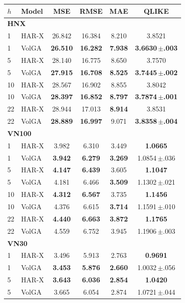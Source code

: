 \begin{tabular}{llcccc}
\toprule
$h$ & Model & MSE & RMSE & MAE & QLIKE \\
\midrule
\multicolumn{6}{l}{\textbf{HNX}} \\
1 & HAR-X & 26.842 & 16.384 & 8.210 & 3.8521 \\
1 & VolGA & \textbf{26.510} & \textbf{16.282} & \textbf{7.938} & \textbf{3.6630\,$\pm$.003} \\
5 & HAR-X & 28.140 & 16.775 & 8.650 & 3.7570 \\
5 & VolGA & \textbf{27.915} & \textbf{16.708} & \textbf{8.525} & \textbf{3.7445\,$\pm$.002} \\
10 & HAR-X & 28.567 & 16.902 & 8.855 & 3.8042 \\
10 & VolGA & \textbf{28.397} & \textbf{16.852} & \textbf{8.797} & \textbf{3.7874\,$\pm$.001} \\
22 & HAR-X & 28.944 & 17.013 & \textbf{8.914} & 3.8531 \\
22 & VolGA & \textbf{28.889} & \textbf{16.997} & 9.071 & \textbf{3.8358\,$\pm$.004} \\
\midrule
\multicolumn{6}{l}{\textbf{VN100}} \\
1 & HAR-X & 3.982 & 6.310 & 3.449 & \textbf{1.0665} \\
1 & VolGA & \textbf{3.942} & \textbf{6.279} & \textbf{3.269} & 1.0854\,$\pm$.036 \\
5 & HAR-X & \textbf{4.147} & \textbf{6.439} & 3.605 & \textbf{1.1047} \\
5 & VolGA & 4.181 & 6.466 & \textbf{3.509} & 1.1302\,$\pm$.021 \\
10 & HAR-X & \textbf{4.312} & \textbf{6.567} & 3.735 & \textbf{1.1456} \\
10 & VolGA & 4.376 & 6.615 & \textbf{3.714} & 1.1591\,$\pm$.010 \\
22 & HAR-X & \textbf{4.440} & \textbf{6.663} & \textbf{3.872} & \textbf{1.1765} \\
22 & VolGA & 4.559 & 6.752 & 3.945 & 1.1906\,$\pm$.003 \\
\midrule
\multicolumn{6}{l}{\textbf{VN30}} \\
1 & HAR-X & 3.496 & 5.913 & 2.763 & \textbf{0.9691} \\
1 & VolGA & \textbf{3.453} & \textbf{5.876} & \textbf{2.660} & 1.0032\,$\pm$.056 \\
5 & HAR-X & \textbf{3.643} & \textbf{6.036} & \textbf{2.854} & \textbf{1.0420} \\
5 & VolGA & 3.665 & 6.054 & 2.874 & 1.0721\,$\pm$.044 \\

\end{tabular}

